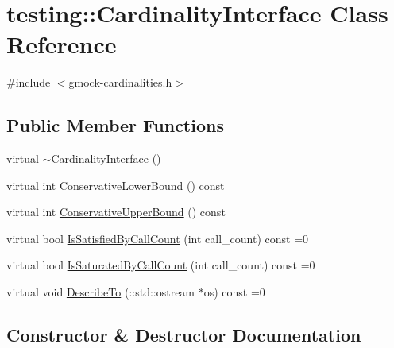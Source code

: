 \hypertarget{classtesting_1_1_cardinality_interface}{}\section{testing\+:\+:Cardinality\+Interface Class Reference}
\label{classtesting_1_1_cardinality_interface}


{\ttfamily \#include $<$gmock-\/cardinalities.\+h$>$}

\subsection*{Public Member Functions}
\begin{DoxyCompactItemize}
\item 
virtual \hyperlink{classtesting_1_1_cardinality_interface_a8d9f9fcf50e5517a7c28a97c1d0737d8}{$\sim$\+Cardinality\+Interface} ()
\item 
virtual int \hyperlink{classtesting_1_1_cardinality_interface_a1aff90c45ff45658fee99d15fd0a6f89}{Conservative\+Lower\+Bound} () const
\item 
virtual int \hyperlink{classtesting_1_1_cardinality_interface_ac741b28605377d603623dddf4b1c8d33}{Conservative\+Upper\+Bound} () const
\item 
virtual bool \hyperlink{classtesting_1_1_cardinality_interface_af89684f4ea6d9de331abf7958754d8f1}{Is\+Satisfied\+By\+Call\+Count} (int call\+\_\+count) const =0
\item 
virtual bool \hyperlink{classtesting_1_1_cardinality_interface_a42508cff9627de2e6f9c1ec33a7d8bf2}{Is\+Saturated\+By\+Call\+Count} (int call\+\_\+count) const =0
\item 
virtual void \hyperlink{classtesting_1_1_cardinality_interface_a8a93e3bbf24d14fe21186802ecef0929}{Describe\+To} (\+::std\+::ostream $\ast$os) const =0
\end{DoxyCompactItemize}


\subsection{Constructor \& Destructor Documentation}
\mbox{\label{classtesting_1_1_cardinality_interface_a8d9f9fcf50e5517a7c28a97c1d0737d8}} 
